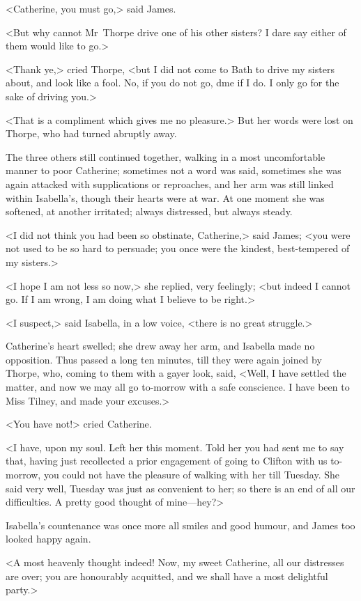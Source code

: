  <Catherine, you must go,> said James. 

 <But why cannot Mr~Thorpe drive one of his other sisters? I dare say either of them would like to go.> 

 <Thank ye,> cried Thorpe, <but I did not come to Bath to drive my sisters about, and look like a fool. No, if you do not go, d\doubleemdash me if I do. I only go for the sake of driving you.> 

 <That is a compliment which gives me no pleasure.> But her words were lost on Thorpe, who had turned abruptly away. 

 The three others still continued together, walking in a most uncomfortable manner to poor Catherine; sometimes not a word was said, sometimes she was again attacked with supplications or reproaches, and her arm was still linked within Isabella's, though their hearts were at war. At one moment she was softened, at another irritated; always distressed, but always steady. 

 <I did not think you had been so obstinate, Catherine,> said James; <you were not used to be so hard to persuade; you once were the kindest, best-tempered of my sisters.> 

 <I hope I am not less so now,> she replied, very feelingly; <but indeed I cannot go. If I am wrong, I am doing what I believe to be right.> 

 <I suspect,> said Isabella, in a low voice, <there is no great struggle.> 

 Catherine's heart swelled; she drew away her arm, and Isabella made no opposition. Thus passed a long ten minutes, till they were again joined by Thorpe, who, coming to them with a gayer look, said, <Well, I have settled the matter, and now we may all go to-morrow with a safe conscience. I have been to Miss Tilney, and made your excuses.> 

 <You have not!> cried Catherine. 

 <I have, upon my soul. Left her this moment. Told her you had sent me to say that, having just recollected a prior engagement of going to Clifton with us to-morrow, you could not have the pleasure of walking with her till Tuesday. She said very well, Tuesday was just as convenient to her; so there is an end of all our difficulties. A pretty good thought of mine—hey?> 

 Isabella's countenance was once more all smiles and good humour, and James too looked happy again. 

 <A most heavenly thought indeed! Now, my sweet Catherine, all our distresses are over; you are honourably acquitted, and we shall have a most delightful party.> 

